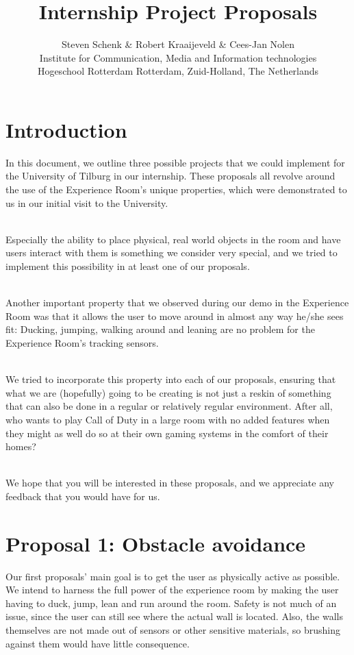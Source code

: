 \documentclass[11pt]{article}
\title{\Huge Internship Project Proposals}
\author{Steven Schenk \& Robert Kraaijeveld \& Cees-Jan Nolen\\
	Institute for Communication, Media and Information technologies\\
	Hogeschool Rotterdam
	Rotterdam, Zuid-Holland, The Netherlands \\
	}
\begin{document}
\nocite{*}
\maketitle
{}
\rhead{}
\lfoot{}
\cfoot{}

\newpage
\tableofcontents
\pagebreak

\newpage
{}
{}
\section*{Introduction}
In this document, we outline three possible projects that we could implement for the University of Tilburg in our internship. These proposals all revolve around the use of the Experience Room's unique properties, which were demonstrated to us in our initial visit to the University. 

~\\
Especially the ability to place physical, real world objects in the room and have users interact with them is something we consider very special, and we tried to implement this possibility in at least one of our proposals. 

~\\
Another important property that we observed during our demo in the Experience Room was that it allows the user to move around in almost any way he/she sees fit: Ducking, jumping, walking around and leaning are no problem for the Experience Room's tracking sensors. 

~\\
We tried to incorporate this property into each of our proposals, ensuring that what we are (hopefully) going to be creating is not just a reskin of something that can also be done in a regular or relatively regular environment. After all, who wants to play Call of Duty in a large room with no added features when they might as well do so at their own gaming systems in the comfort of  their homes?

~\\
We hope that you will be interested in these proposals, and we appreciate any feedback that you would have for us.


\newpage
{}
{}
\section*{Proposal 1:  Obstacle avoidance}
Our first proposals' main goal is to get the user as physically active as possible. We intend to harness the full power of the experience room by making the user having to duck, jump, lean and run around the room. Safety is not much of an issue, since the user can still see where the actual wall is located. Also, the walls themselves are not made out of sensors or other sensitive materials, so brushing against them would have little consequence.
\end{document}
